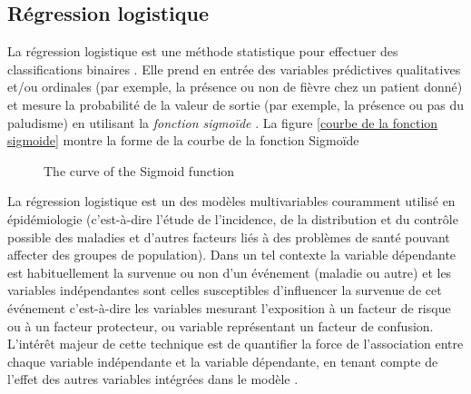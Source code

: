 \subsection{Régression logistique}
La régression logistique est une méthode statistique pour effectuer des classifications binaires \cite{Ch14}. Elle prend en entrée des variables prédictives qualitatives et/ou ordinales (par exemple, la présence ou non de fièvre chez  un patient donné) et mesure la probabilité de la valeur de sortie (par exemple, la présence ou pas du paludisme)  en utilisant la \emph{fonction sigmoïde} . La figure \ref{courbe de la fonction sigmoide} montre la forme de la courbe de la fonction Sigmoïde
\begin{figure}[ht]
\centering
{}
\caption{The curve of the Sigmoid function}\label{sigmoid_curve}
\end{figure}

La régression logistique est un des modèles multivariables couramment utilisé en épidémiologie \cite{Am02,Pr05}  (c’est-à-dire l’étude de l’incidence, de la distribution et du contrôle possible des maladies et d’autres facteurs liés à des problèmes de santé pouvant affecter des groupes de population). Dans un tel contexte la variable dépendante est habituellement la survenue ou non d'un événement (maladie ou autre) et les variables indépendantes sont celles susceptibles d'influencer la survenue de cet événement c'est-à-dire les variables mesurant l'exposition à un facteur de risque ou à un facteur protecteur, ou variable représentant un facteur de confusion. L'intérêt majeur de cette technique est de quantifier la force de l'association entre chaque variable indépendante et la variable dépendante, en tenant compte de l'effet des autres variables intégrées dans le modèle \cite{Am02} .

